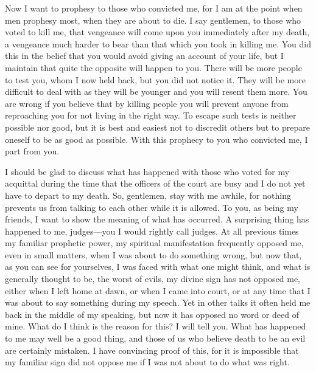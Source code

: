 Now I want to prophesy to those who convicted me, for I am at the point when men prophesy
most, when they are about to die. I say gentlemen, to those who voted to kill me, that vengeance
will come upon you immediately after my death, a vengeance much harder to bear than that which
you took in killing me. You did this in the belief that you would avoid giving an account of your
life, but I maintain that quite the opposite will happen to you. There will be more people to test
you, whom I now held back, but you did not notice it. They will be more difficult to deal with as
they will be younger and you will resent them more. You are wrong if you believe that by killing
people you will prevent anyone from reproaching you for not living in the right way. To escape
such tests is neither possible nor good, but it is best and easiest not to discredit others but to
prepare oneself to be as good as possible. With this prophecy to you who convicted me, I part from
you.

I should be glad to discuss what has happened with those who voted for my acquittal during
the time that the officers of the court are busy and I do not yet have to depart to my death. So,
gentlemen, stay with me awhile, for nothing prevents us from talking to each other while it is
allowed. To you, as being my friends, I want to show the meaning of what has occurred. A
surprising thing has happened to me, judges—you I would rightly call judges. At all previous times
my familiar prophetic power, my spiritual manifestation frequently opposed me, even in small
matters, when I was about to do something wrong, but now that, as you can see for yourselves, I
was faced with what one might think, and what is generally thought to be, the worst of evils, my
divine sign has not opposed me, either when I left home at dawn, or when I came into court, or at
any time that I was about to say something during my speech. Yet in other talks it often held me
back in the middle of my speaking, but now it has opposed no word or deed of mine. What do I
think is the reason for this? I will tell you. What has happened to me may well be a good thing, and
those of us who believe death to be an evil are certainly mistaken. I have convincing proof of this,
for it is impossible that my familiar sign did not oppose me if I was not about to do what was right.

